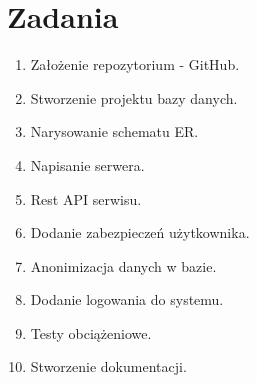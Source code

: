 \section{Zadania}

\begin{enumerate}
    \item Założenie repozytorium - GitHub.
    \item Stworzenie projektu bazy danych.
    \item Narysowanie schematu ER.
    \item Napisanie serwera.
    \item Rest API serwisu.
    \item Dodanie zabezpieczeń użytkownika.
    \item Anonimizacja danych w bazie.
    \item Dodanie logowania do systemu.
    \item Testy obciążeniowe.
    \item Stworzenie dokumentacji.
\end{enumerate}